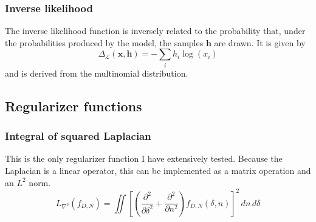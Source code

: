 \documentclass[journal]{IEEEtran}
\begin{document}
\subsubsection{Inverse likelihood}
The inverse likelihood function is inversely related to the probability that, under the probabilities produced by the model, the samples $\mathbf{h}$ are drawn. It is given by
\begin{equation}
\Delta_{\mathcal{L}}(\mathbf{x},\mathbf{h})=-\sum_{i}h_i\log(x_i)
\end{equation}
and is derived from the multinomial distribution.
\subsection{Regularizer functions}
\subsubsection{Integral of squared Laplacian}
This is the only regularizer function I have extensively tested. Because the Laplacian is a linear operator, this can be implemented as a matrix operation and an $L^2$ norm.
\begin{equation}
    L_{\nabla^2}(f_{\scriptscriptstyle{D}, \scriptscriptstyle{N}})=\iint\left[\left(\frac{\partial^2}{\partial \delta^2}+\frac{\partial^2}{\partial n^2}\right)f_{\scriptscriptstyle{D}, \scriptscriptstyle{N}}(\delta, n)\right]^2\, dn\,d\delta
\end{equation}
\printbibliography
\end{document}
